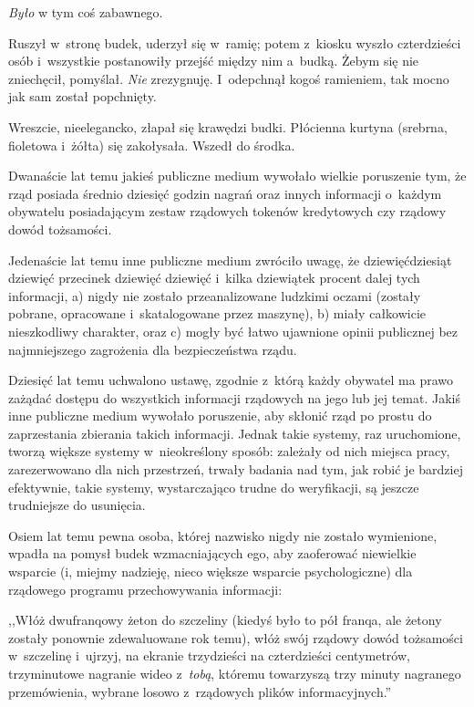 \documentclass[oneside,polish,11pt,rmheadings]{mwbk}
\begin{document}
\textit{Było }w tym coś zabawnego. 

Ruszył w~stronę budek, uderzył się w~ramię; potem z~kiosku wyszło czterdzieści osób i~wszystkie postanowiły przejść między nim a~budką. Żebym się nie zniechęcił, pomyślał. \textit{Nie }zrezygnuję. I~odepchnął kogoś ramieniem, tak mocno jak sam został popchnięty. 

Wreszcie, nieelegancko, złapał się krawędzi budki. Płócienna kurtyna (srebrna, fioletowa i~żółta) się zakołysała. Wszedł do środka. 

Dwanaście lat temu jakieś publiczne medium wywołało wielkie poruszenie tym, że rząd posiada średnio dziesięć godzin nagrań oraz innych informacji o~każdym obywatelu posiadającym zestaw rządowych tokenów kredytowych czy rządowy dowód tożsamości. 

Jedenaście lat temu inne publiczne medium zwróciło uwagę, że dziewięćdziesiąt dziewięć przecinek dziewięć dziewięć i~kilka dziewiątek procent dalej tych informacji, a) nigdy nie zostało przeanalizowane ludzkimi oczami (zostały pobrane, opracowane i~skatalogowane przez maszynę), b) miały całkowicie nieszkodliwy charakter, oraz c) mogły być łatwo ujawnione opinii publicznej bez najmniejszego zagrożenia dla bezpieczeństwa rządu. 

Dziesięć lat temu uchwalono ustawę, zgodnie z~którą każdy obywatel ma prawo zażądać dostępu do wszystkich informacji rządowych na jego lub jej temat. Jakiś inne publiczne medium wywołało poruszenie, aby skłonić rząd po prostu do zaprzestania zbierania takich informacji. Jednak takie systemy, raz uruchomione, tworzą większe systemy w~nieokreślony sposób: zależały od nich miejsca pracy, zarezerwowano dla nich przestrzeń, trwały badania nad tym, jak robić je bardziej efektywnie, takie systemy, wystarczająco trudne do weryfikacji, są jeszcze trudniejsze do usunięcia. 

Osiem lat temu pewna osoba, której nazwisko nigdy nie zostało wymienione, wpadła na pomysł budek wzmacniających ego, aby zaoferować niewielkie wsparcie (i, miejmy nadzieję, nieco większe wsparcie psychologiczne) dla rządowego programu przechowywania informacji: 

\noindent ,,Włóż dwufranqowy żeton do szczeliny (kiedyś było to pół franqa, ale żetony zostały ponownie zdewaluowane rok temu), włóż swój rządowy dowód tożsamości w~szczelinę i~ujrzyj, na ekranie trzydzieści na czterdzieści centymetrów, trzyminutowe nagranie wideo z~\textit{tobą}, któremu towarzyszą trzy minuty nagranego przemówienia, wybrane losowo z~rządowych plików informacyjnych.''
\end{document}
